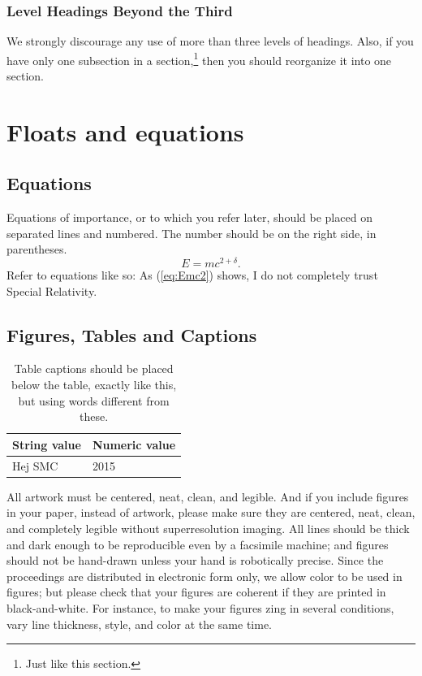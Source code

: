 \documentclass{article}
\begin{document}
\subsubsection{Level Headings Beyond the Third}
We strongly discourage any use of
more than three levels of headings.
Also, if you have only one subsection in a section,\footnote{Just like this section.}
then you should reorganize it into one section.

\section{Floats and equations}

\subsection{Equations}
Equations of importance,
or to which you refer later,
should be placed on separated lines and numbered.
The number should be on the right side, in parentheses.
\begin{equation}
E=mc^{2+\delta}.
\label{eq:Emc2}
\end{equation}
Refer to equations like so:
As (\ref{eq:Emc2}) shows,
I do not completely trust Special Relativity.

\subsection{Figures, Tables and Captions}
\begin{table}[t]
 \begin{center}
 \begin{tabular}{|l|l|}
  \hline
  String value & Numeric value \\
  \hline
  Hej SMC  & 2015 \\
  \hline
 \end{tabular}
\end{center}
 \caption{Table captions should be placed below the table, exactly like this,
 but using words different from these.}
 \label{tab:example}
\end{table}

All artwork must be centered, neat, clean, and legible.
And if you include figures in your paper, instead of artwork,
please make sure they are centered, neat, clean,
and completely legible without superresolution imaging.
All lines should be thick and dark enough to be reproducible
even by a facsimile machine;
and figures should not be hand-drawn unless your hand is robotically precise.
Since the proceedings are distributed in electronic form only,
we allow color to be used in figures;
but please check that your figures are
coherent if they are printed in black-and-white.
For instance, to make your figures zing in several conditions,
vary line thickness, style, and color at the same time.
\end{document}
